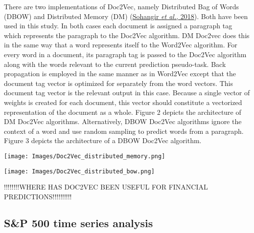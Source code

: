 \documentclass[11pt,preprint, authoryear]{elsarticle}
\let\origfigure\figure
\let\endorigfigure\endfigure
\renewenvironment{figure}[1][2] {
    \expandafter\origfigure\expandafter[H]
} {
    \endorigfigure
}
\numberwithin{equation}{section}
\numberwithin{figure}{section}
\numberwithin{table}{section}
\begin{document}
There are two implementations of Doc2Vec, namely Distributed Bag of
Words (DBOW) and Distributed Memory (DM)
(\protect\hyperlink{ref-sohangir2018financial}{Sohangir \emph{et al.},
2018}). Both have been used in this study. In both cases each document
is assigned a paragraph tag which represents the paragraph to the
Doc2Vec algorithm. DM Doc2vec does this in the same way that a word
represents itself to the Word2Vec algorithm. For every word in a
document, its paragraph tag is passed to the Doc2Vec algorithm along
with the words relevant to the current prediction pseudo-task. Back
propagation is employed in the same manner as in Word2Vec except that
the document tag vector is optimized for separately from the word
vectors. This document tag vector is the relevant output in this case.
Because a single vector of weights is created for each document, this
vector should constitute a vectorized representation of the document as
a whole. Figure 2 depicts the architecture of DM Doc2Vec algorithms.
Alternatively, DBOW Doc2Vec algorithms ignore the context of a word and
use random sampling to predict words from a paragraph. Figure 3 depicts
the architecture of a DBOW Doc2Vec algorithm.

\begin{figure}
\centering
\texttt{[image: Images/Doc2Vec\_distributed\_memory.png]}
\caption{Doc2Vec model - distributed memory architecture: dm = 1}
\end{figure}

\begin{figure}
\centering
\texttt{[image: Images/Doc2Vec\_distributed\_bow.png]}
\caption{Doc2Vec model - distributed bag of words architecture: dm = 0}
\end{figure}

!!!!!!!!WHERE HAS DOC2VEC BEEN USEFUL FOR FINANCIAL
PREDICTIONS!!!!!!!!!!

\hypertarget{sp-500-time-series-analysis}{%
\subsection{S\&P 500 time series
analysis}\label{sp-500-time-series-analysis}}
\end{document}
